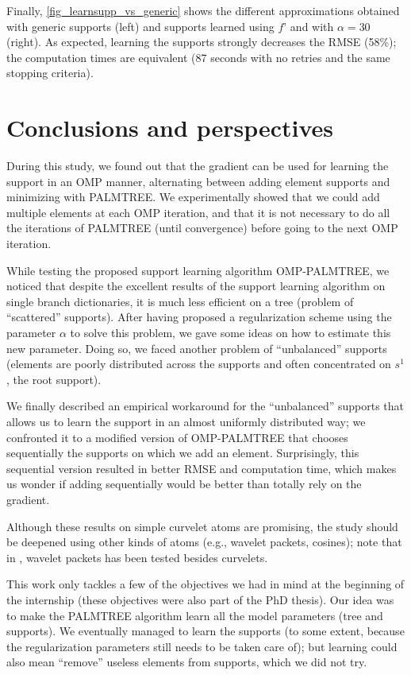 Finally, \cref{fig_learnsupp_vs_generic} shows the different approximations obtained with generic supports (left) and supports learned using $f’$ and with $\alpha=30$ (right). As expected, learning the supports strongly decreases the RMSE (58\%); the computation times are equivalent (87 seconds with no retries and the same stopping criteria).


\FloatBarrier
\section{Conclusions and perspectives}

 
During this study, we found out that the gradient can be used for learning the support in an \ac{OMP} manner, alternating between adding element supports and minimizing with PALMTREE. We experimentally showed that we could add multiple elements at each OMP iteration, and that it is not necessary to do all the iterations of PALMTREE (until convergence) before going to the next OMP iteration. 

\noindent
While testing the proposed support learning algorithm OMP-PALMTREE, we noticed that despite the excellent results of the support learning algorithm on single branch dictionaries, it is much less efficient on a tree (problem of “scattered” supports). After having proposed a regularization scheme using the parameter $\alpha$ to solve this problem, we gave some ideas on how to estimate this new parameter. Doing so, we faced another problem of “unbalanced” supports (elements are poorly distributed across the supports and often concentrated on $s^1$, the root support). 

\noindent
We finally described an empirical workaround for the “unbalanced” supports that allows us to learn the support in an almost uniformly distributed way; we confronted it to a modified version of OMP-PALMTREE that chooses sequentially the supports on which we add an element. Surprisingly, this sequential version resulted in better RMSE and computation time, which makes us wonder if adding sequentially would be better than totally rely on the gradient.

\noindent
Although these results on simple curvelet atoms are promising, the study should be deepened using other kinds of atoms (e.g., wavelet packets, cosines); note that in \cite{chabiron_optimization_2016}, wavelet packets has been tested besides curvelets.

This work only tackles a few of the objectives we had in mind at the beginning of the internship (these objectives were also part of the PhD thesis). Our idea was to make the PALMTREE algorithm learn all the model parameters (tree and supports). We eventually managed to learn the supports (to some extent, because the regularization parameters still needs to be taken care of); but learning could also mean “remove” useless elements from supports, which we did not try.
 
